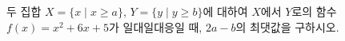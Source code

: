 두 집합 $X=\{x \mid x\ge a\}$, $Y=\{y \mid y\ge b\}$에 대하여 $X$에서 $Y$로의 함수 $f(x)=x^2+6x+5$가 일대일대응일 때, $2a-b$의 최댓값을 구하시오. 
